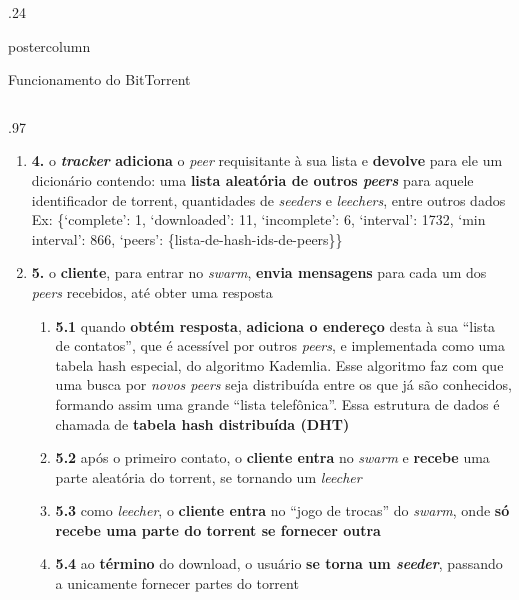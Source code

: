 \documentclass[final,brazil]{beamer}
\newenvironment{innercol}[3][.97\textwidth]{
\begin{columns}
  \hspace{#2}
  \begin{column}{#1}
    \vspace{#3}
    \justifying
}{
  \end{column}
\end{columns}
}
\begin{document}
\begin{frame}
\begin{columns}
\begin{column}{.24\textwidth}
\begin{beamercolorbox}[center,wd=\textwidth]{postercolumn}
\begin{minipage}[T]{.95\textwidth}
{\begin{block}{Funcionamento do BitTorrent}
\begin{innercol}{-6ex}{-1.4ex}
\begin{enumerate}
                  \item \textbf{4.} o \textbf{\emph{tracker} adiciona} o \emph{peer}
                    requisitante à sua lista e \textbf{devolve} para ele um dicionário
                    contendo: uma \textbf{lista aleatória de outros \emph{peers}} para
                    aquele identificador de torrent, quantidades de \emph{seeders} e
                    \emph{leechers}, entre outros dados \\
                    Ex: \{`complete': 1, `downloaded': 11, `incomplete': 6, `interval':
                    1732, `min interval': 866, `peers': \{lista-de-hash-ids-de-peers\}\}

                  \item \textbf{5.} o \textbf{cliente}, para entrar no \emph{swarm},
                    \textbf{envia mensagens} para cada um dos \emph{peers} recebidos,
                    até obter uma resposta

                  \begin{enumerate}
                    \justifying
                    \item \textbf{5.1} quando \textbf{obtém resposta}, \textbf{adiciona
                      o endereço} desta à sua ``lista de contatos'', que é
                      acessível por outros \emph{peers}, e implementada como uma tabela
                      hash especial, do algoritmo Kademlia. Esse algoritmo faz com que
                      uma busca por \emph{novos peers} seja distribuída entre os que já
                      são conhecidos, formando assim uma grande ``lista telefônica''.
                      Essa estrutura de dados é chamada de \textbf{tabela hash
                      distribuída (DHT)}

                    \item \textbf{5.2} após o primeiro contato, o \textbf{cliente
                      entra} no \emph{swarm} e \textbf{recebe} uma parte aleatória do
                      torrent, se tornando um \emph{leecher}

                    \item \textbf{5.3} como \emph{leecher}, o \textbf{cliente entra} no
                      ``jogo de trocas'' do \emph{swarm}, onde \textbf{só recebe uma
                      parte do torrent se fornecer outra}

                    \item \textbf{5.4} ao \textbf{término} do download, o usuário
                      \textbf{se torna um \emph{seeder}}, passando a unicamente
                      fornecer partes do torrent
                  \end{enumerate}
                \end{enumerate}
              \end{innercol}
            \end{block}

}
\end{minipage}
\end{beamercolorbox}
\end{column}
\end{columns}
\end{frame}
\end{document}
